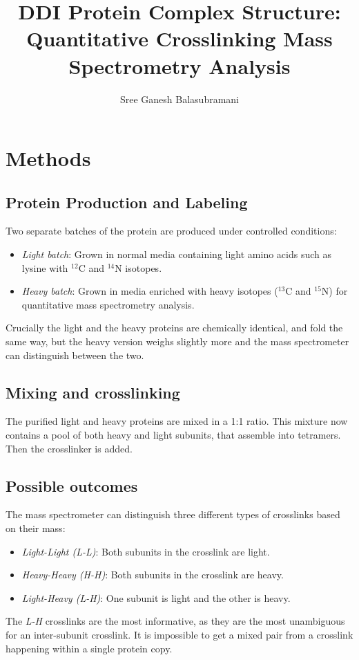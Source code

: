 \documentclass[11pt,a4paper]{report}
\author{Sree Ganesh Balasubramani}
\title{DDI Protein Complex Structure:\\Quantitative Crosslinking Mass Spectrometry Analysis}
\begin{document}
\maketitle

\chapter{Methods}
\label{chap:methods}

\section{Protein Production and Labeling}
\label{sec:labeling}

Two separate batches of the protein are produced under controlled conditions:

\begin{itemize}
    \item \emph{Light batch}: Grown in normal media containing light amino 
    acids such as lysine with $^{12}$C and $^{14}$N isotopes.
    \item \emph{Heavy batch}: Grown in media enriched with heavy 
    isotopes ($^{13}$C and $^{15}$N) for quantitative mass spectrometry analysis.
\end{itemize}
Crucially the light and the heavy proteins are chemically identical, and fold 
the same way, but the heavy version weighs slightly more and the mass spectrometer 
can distinguish between the two.

\section{Mixing and crosslinking}
\label{sec:mixing}
The purified light and heavy proteins are mixed in a 1:1 ratio. This mixture now contains 
a pool of both heavy and light subunits, that assemble into tetramers. 
Then the crosslinker is added.

\section{Possible outcomes}
The mass spectrometer can distinguish three different types of crosslinks based on 
their mass:
\begin{itemize}
\item \emph{Light-Light (L-L)}: Both subunits in the crosslink are light.
\item \emph{Heavy-Heavy (H-H)}: Both subunits in the crosslink are heavy.
\item \emph{Light-Heavy (L-H)}: One subunit is light and the other is heavy.
\end{itemize}
The \emph{L-H} crosslinks are the most informative, as they are the most 
unambiguous for an inter-subunit crosslink. It is impossible to get a mixed pair 
from a crosslink happening within a single protein copy. 
\end{document}
